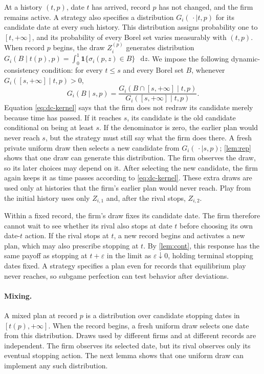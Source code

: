 \documentclass[12pt,reqno]{article}
\newcommand{\de}{\mathop{}\!\mathrm{d}}
\newcommand{\e}{\varepsilon}
\theoremstyle{definition} \newtheorem{example}{Example}
\theoremstyle{definition} \newtheorem{condition}{Condition}
\theoremstyle{definition} \newtheorem{corollary}{Corollary}
\theoremstyle{definition} \newtheorem{claim}{Claim}
\theoremstyle{definition} \newtheorem{definition}{Definition}
\theoremstyle{definition} \newtheorem{conjecture}{Conjecture}
\theoremstyle{definition} \newtheorem{Lemma}{Lemma}
\theoremstyle{definition} \newtheorem{lemma}{Lemma}
\theoremstyle{plain} \newtheorem{theorem}{Theorem}
\theoremstyle{definition} \newtheorem{assumption}{Assumption}
\theoremstyle{definition} \newtheorem*{assumptionnonumber}{Assumption}
\theoremstyle{definition} \newtheorem*{theoremNoNumber}{Proposition}
\theoremstyle{definition}
\theoremstyle{definition}\newtheorem{proposition}{Proposition}
\theoremstyle{definition} \newtheorem{result}{Result}
\theoremstyle{definition} \newtheorem*{definitionNoNumber}{Definition}
\theoremstyle{definition} \newtheorem{Definition}{Definition}
\theoremstyle{definition} \newtheorem*{DefinitionNoNumber}{Definition}
\theoremstyle{definition} \newtheorem*{fact}{Fact}
\theoremstyle{definition} \newtheorem*{property}{Property}
\theoremstyle{definition} \newtheorem{remark}{Remark}
\begin{document}
At a history $(t,p)$, date $t$ has arrived, record $p$ has not changed, and the firm remains active. A strategy also specifies a distribution $G_i(\,\cdot\mid t,p)$ for its candidate date at every such history. This distribution assigns probability one to $[t,+\infty]$, and its probability of every Borel set varies measurably with $(t,p)$. When record $p$ begins, the draw $Z_i^{(p)}$ generates  distribution
$
G_i(B\mid t(p),p)
=
\int_0^1\mathbf 1\{\sigma_i(p,z)\in B\}\,\de z .$
We impose the following dynamic-consistency condition:
for every $t\le s$ and every Borel set $B$, whenever $G_i([s,+\infty]\mid t,p)>0$,
\begin{equation*}
G_i(B\mid s,p)
=
\frac{G_i(B\cap[s,+\infty]\mid t,p)}
     {G_i([s,+\infty]\mid t,p)} .
\tag{DC}\label{eq:dc-kernel}
\end{equation*}
Equation \eqref{eq:dc-kernel} says that the firm does not redraw its candidate merely because time has passed. If it reaches $s$, its candidate is the old candidate conditional on being at least $s$. If the denominator is zero, the earlier plan would never reach $s$, but the strategy must still say what the firm does there. A fresh private uniform draw then selects a new candidate from $G_i(\,\cdot\mid s,p)$; \cref{lem:rep} shows that one draw can generate this distribution. The firm observes the draw, so its later choices may depend on it. After selecting the new candidate, the firm again keeps it as time passes according to \eqref{eq:dc-kernel}. These extra draws are used only at histories that the firm's earlier plan would never reach. Play from the initial history uses only $Z_{i,1}$ and, after the rival stops, $Z_{i,2}$.

Within a fixed record, the firm's draw fixes its candidate date. The firm therefore cannot wait to see whether its rival also stops at date $t$ before choosing its own date-$t$ action. If the rival stops at $t$, a new record begins and activates a new plan, which may also prescribe stopping at $t$. By \cref{lem:cont}, this response has the same payoff as stopping at $t+\e$ in the limit as $\e\downarrow0$, holding terminal stopping dates fixed. A strategy specifies a plan even for records that equilibrium play never reaches, so subgame perfection can test behavior after deviations.

\paragraph{Mixing.}
A mixed plan at record $p$ is a distribution over candidate stopping dates in $[t(p),+\infty]$. When the record begins, a fresh uniform draw selects one date from this distribution. Draws used by different firms and at different records are independent. The firm observes its selected date, but its rival observes only its eventual stopping action. The next lemma shows that one uniform draw can implement any such distribution.
\end{document}
